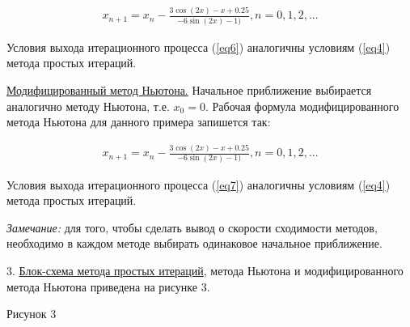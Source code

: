 \documentclass[utf8x, 14pt, oneside, a4paper]{article}
\begin{document}
	\begin{align}\label{eq6}
	x_{n+1} = x_n - \frac{3 \cos(2x) - x + 0.25}{-6 \sin(2x) - 1)}, n = 0, 1, 2, ...
	\end{align}

	Условия выхода итерационного процесса (\ref{eq6}) аналогичны условиям
	(\ref{eq4}) метода простых итераций.

	\underline{Модифицированный метод Ньютона.} Начальное приближение  выбирается
	аналогично методу Ньютона, т.е. $x_0 = 0$. Рабочая формула модифицированного
	метода Ньютона  для данного примера запишется так:

	\begin{align}\label{eq7}
	x_{n+1} = x_n - \frac{3 \cos(2x) - x + 0.25}{-6 \sin(2x) - 1)}, n = 0, 1, 2, ...
	\end{align}

	Условия выхода итерационного процесса (\ref{eq7}) аналогичны условиям
	(\ref{eq4}) метода простых итераций.

	\textit{Замечание:} для того, чтобы сделать вывод о скорости сходимости методов,
	необходимо в каждом методе выбирать одинаковое начальное приближение.

3. \underline{Блок-схема метода простых итераций}, метода Ньютона и модифицированного метода Ньютона приведена на рисунке 3.

\begin{center}
\end{center}
\begin{center}
\small{Рисунок 3}
\end{center}
\end{document}
